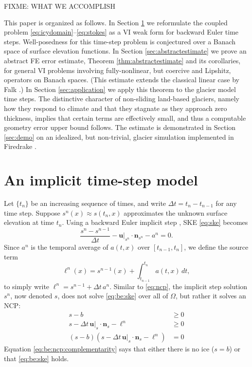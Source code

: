 \documentclass[hidelinks,onefignum,onetabnum,final]{siamart220329}  %
\newcommand{\bn}{\mathbf{n}}
\newcommand{\bu}{\mathbf{u}}
\begin{document}
FIXME: WHAT WE ACCOMPLISH

This paper is organized as follows.  In Section \ref{sec:models} we reformulate the coupled problem \eqref{eq:icydomain}--\eqref{eq:stokes} as a VI weak form for backward Euler time steps.  Well-posedness for this time-step problem is conjectured over a Banach space of surface elevation functions.  In Section \ref{sec:abstractestimate} we prove an abstract FE error estimate, Theorem \ref{thm:abstractestimate} and its corollaries, for general VI problems involving fully-nonlinear, but coercive and Lipshitz, operators on Banach spaces.  (This estimate extends the classical linear  case by Falk \cite{Falk1974}.)  In Section \ref{sec:application} we apply this theorem to the glacier model time steps.  The distinctive character of non-sliding land-based glaciers, namely how they respond to climate and that they stagnate as they approach zero thickness, implies that certain terms are effectively small, and thus a computable geometry error upper bound follows.  The estimate is demonstrated in Section \ref{sec:demo} on an idealized, but non-trivial, glacier simulation implemented in Firedrake \cite{Hametal2023}.


\section{An implicit time-step model} \label{sec:models}

Let $\{t_n\}$ be an increasing sequence of times, and write $\Delta t = t_n-t_{n-1}$ for any time step.  Suppose $s^n(x)\approx s(t_n,x)$ approximates the unknown surface elevation at time $t_n$.  Using a backward Euler implicit step \cite{AscherPetzold1998}, SKE \eqref{eq:ske} becomes
\begin{equation}
\frac{s^n - s^{n-1}}{\Delta t} - \bu|_{s^n} \cdot \bn_{s^n} - a^n = 0. \label{eq:be:ske}
\end{equation}
Since $a^n$ is the temporal average of $a(t,x)$ over $[t_{n-1},t_n]$, we define the source term
\begin{equation}
\ell^n(x) = s^{n-1}(x) + \int_{t_{n-1}}^{t_n} a(t,x)\,dt, \label{eq:be:source}
\end{equation}
to simply write $\ell^n=s^{n-1}+\Delta t\,a^n$.  Similar to \eqref{eq:ncp}, the implicit step solution $s^n$, now denoted $s$, does not solve \eqref{eq:be:ske} over all of $\Omega$, but rather it solves an NCP:
\begin{subequations}
\label{eq:be:ncp}
\begin{align}
s - b &\ge 0 \label{eq:be:ncp:constraint} \\
s - \Delta t\,\bu|_s \cdot \bn_s - \ell^n &\ge 0 \\
(s - b) \left(s - \Delta t\,\bu|_s \cdot \bn_s - \ell^n\right) &= 0 \label{eq:be:ncp:complementarity}
\end{align}
\end{subequations}
Equation \eqref{eq:be:ncp:complementarity} says that either there is no ice ($s=b$) or that \eqref{eq:be:ske} holds.
\end{document}
